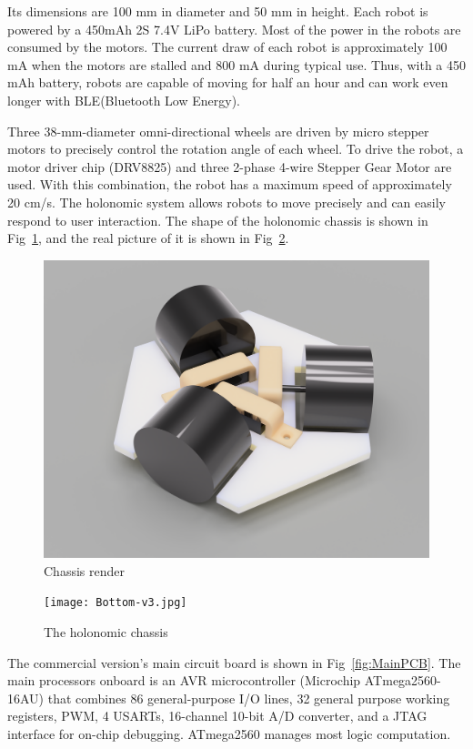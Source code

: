 \documentclass[sigconf]{acmart}
\begin{document}
Its dimensions are 100 mm in diameter and 50 mm in height. Each robot is powered by a 450mAh 2S 7.4V LiPo battery. Most of the power in the robots are consumed by the motors. The current draw of each robot is approximately 100 mA when the motors are stalled and 800 mA during typical use. Thus, with a 450 mAh battery, robots are capable of moving for half an hour and can work even longer with BLE(Bluetooth Low Energy). 

Three 38-mm-diameter omni-directional wheels are driven by micro stepper motors to precisely control the rotation angle of each wheel. To drive the robot, a motor driver chip (DRV8825) and three 2-phase 4-wire Stepper Gear Motor are used. With this combination, the robot has a maximum speed of approximately 20 cm/s. The holonomic system allows robots to move precisely and can easily respond to user interaction. The shape of the holonomic chassis is shown in Fig~\ref{fig:ChassisRender}, and the real picture of it is shown in Fig~\ref{fig:chassis}.

\begin{figure}[h]
  \centering
  \includegraphics[width=\linewidth]{Assembled.png}
  \caption{Chassis render}
  \label{fig:ChassisRender}
\end{figure}

\begin{figure}[h]
  \centering
  \texttt{[image: Bottom-v3.jpg]}
  \caption{The holonomic chassis}
  \label{fig:chassis}
\end{figure}

The commercial version's main circuit board is shown in Fig~\ref{fig:MainPCB}. The main processors onboard is an AVR microcontroller (Microchip ATmega2560-16AU) that combines 86 general-purpose I/O lines, 32 general purpose working registers, PWM, 4 USARTs, 16-channel 10-bit A/D converter, and a JTAG interface for on-chip debugging. ATmega2560 manages most logic computation.
\end{document}
